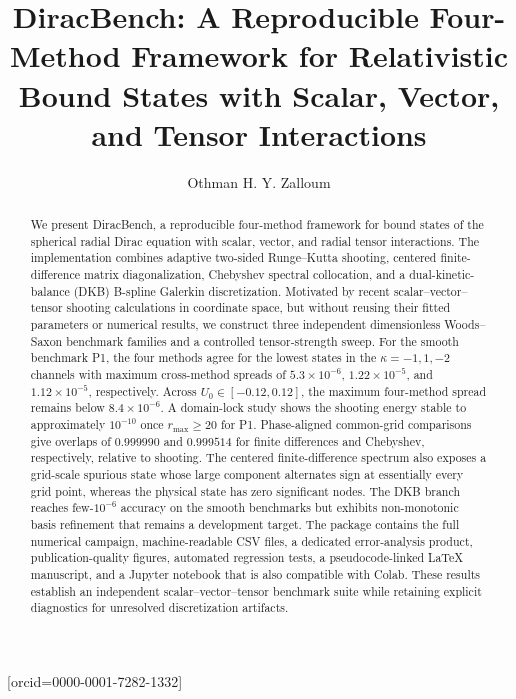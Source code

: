 \documentclass[a4paper,fleqn]{cas-dc}
\begin{document}
\let\WriteBookmarks\relax
\renewcommand{\topfraction}{.95}
\renewcommand{\bottomfraction}{.9}
\renewcommand{\textfraction}{.05}
\renewcommand{\floatpagefraction}{.8}
\renewcommand{\dbltopfraction}{.95}
\renewcommand{\dblfloatpagefraction}{.75}
\setcounter{topnumber}{3}
\setcounter{bottomnumber}{2}
\setcounter{totalnumber}{5}
\setcounter{dbltopnumber}{3}


\title [mode = title]{DiracBench: A Reproducible Four-Method Framework for Relativistic Bound States with Scalar, Vector, and Tensor Interactions}

\author[1]{Othman H. Y. Zalloum}[orcid=0000-0001-7282-1332]
\cormark[1]

\begin{abstract}
We present DiracBench, a reproducible four-method framework for bound states of the spherical radial Dirac equation with scalar, vector, and radial tensor interactions. The implementation combines adaptive two-sided Runge--Kutta shooting, centered finite-difference matrix diagonalization, Chebyshev spectral collocation, and a dual-kinetic-balance (DKB) B-spline Galerkin discretization. Motivated by recent scalar--vector--tensor shooting calculations in coordinate space, but without reusing their fitted parameters or numerical results, we construct three independent dimensionless Woods--Saxon benchmark families and a controlled tensor-strength sweep. For the smooth benchmark P1, the four methods agree for the lowest states in the $\kappa=-1,1,-2$ channels with maximum cross-method spreads of $5.3\times10^{-6}$, $1.22\times10^{-5}$, and $1.12\times10^{-5}$, respectively. Across $U_0\in[-0.12,0.12]$, the maximum four-method spread remains below $8.4\times10^{-6}$. A domain-lock study shows the shooting energy stable to approximately $10^{-10}$ once $r_{\max}\ge20$ for P1. Phase-aligned common-grid comparisons give overlaps of $0.999990$ and $0.999514$ for finite differences and Chebyshev, respectively, relative to shooting. The centered finite-difference spectrum also exposes a grid-scale spurious state whose large component alternates sign at essentially every grid point, whereas the physical state has zero significant nodes. The DKB branch reaches few-$10^{-6}$ accuracy on the smooth benchmarks but exhibits non-monotonic basis refinement that remains a development target. The package contains the full numerical campaign, machine-readable CSV files, a dedicated error-analysis product, publication-quality figures, automated regression tests, a pseudocode-linked LaTeX manuscript, and a Jupyter notebook that is also compatible with Colab. These results establish an independent scalar--vector--tensor benchmark suite while retaining explicit diagnostics for unresolved discretization artifacts.
\end{abstract}
\end{document}

